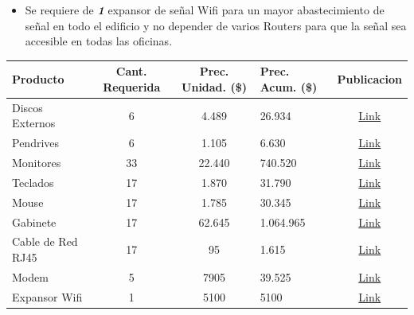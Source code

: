 \documentclass[
10pt, %
a4paper, %
oneside, %
headinclude,footinclude, %
BCOR5mm, %
]{scrartcl}
\begin{document}
\begin{itemize}
\begin{itemize}
    \item Se requiere de \emph { \textbf{1} } expansor de señal Wifi
            para un mayor abastecimiento de señal en todo el edificio y
            no depender de varios Routers para que la señal sea accesible en
            todas las oficinas.
  \end{itemize}
\end{itemize}

  \begin{table}[!th]
    \begin{tabular}{|l|c|c|l|c|}
      Producto         & Cant. Requerida  & Prec. Unidad. (\$) & Prec. Acum. (\$) & Publicacion  \\
    \hline
      Discos Externos  &  6  & 4.489 & 26.934 & \href{http://www.pc-retail.com.ar/prod/id=7615/GlobalBluePoint-ERP.aspx#toner} {Link}  \\
      Pendrives        & 6  & 1.105  & 6.630 & \href{https://www.computershopping.com.ar/Producto/Pen-Drive-Kingston-DataTraveler-100-G3-32GB-USB-3-0} {Link}  \\
      Monitores       & 33  & 22.440  & 740.520  & \href{https://www.computershopping.com.ar/Producto/Monitor-LED-Samsung-22--LS22F350-Full-HD-con-dise\%c3\%b1o-Super-Slim} {Link}  \\
      Teclados        & 17 & 1.870  & 31.790 & \href{https://www.computershopping.com.ar/Producto/Teclado-en-Espa\%c3\%b1ol-Logitech-K120-USB} {Link}  \\
      Mouse           & 17 & 1.785  & 30.345 & \href{https://www.computershopping.com.ar/Producto/Mouse-Logitech-Wireless-M170-Negro} {Link}  \\
      Gabinete        & 17 & 62.645  & 1.064.965 & \href{https://www.computershopping.com.ar/Producto/Computadora-CS-Ryzen-5-Pro} {Link}  \\
      Cable de Red RJ45 & 17 & 95  & 1.615  & \href{https://articulo.mercadolibre.com.ar/MLA-660810957-cable-de-red-utp-2-metros-rj45-cat-5e-patch-cord-ethernet-_JM#position=2&type=item&tracking_id=84f5b843-02ea-40a7-abc9-73691821a8ca} {Link}  \\
      Modem           & 5  & 7905 & 39.525   & \href{https://www.computershopping.com.ar/Producto/Router-Wireless-N-de-Alta-Potencia-TP-Link-(TL-WR941HP)---3-Antenas-9dBi} {Link}  \\
      Expansor Wifi   & 1 & 5100  & 5100  & \href{https://www.computershopping.com.ar/Producto/Extensor-de-Cobertura-WiFi-Universal-a-300Mbps-TL-WA850RE} {Link} \\
    \hline
    \end{tabular}
  \end{table}
\end{document}
